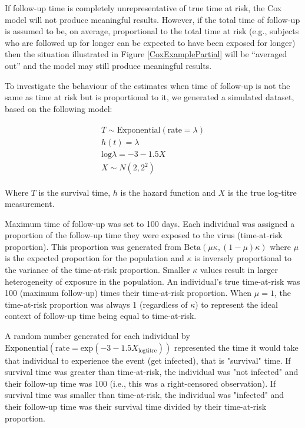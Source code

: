 If follow-up time is completely unrepresentative of true time at risk, the Cox model will not produce meaningful results. However, if the total time of follow-up is assumed to be, on average, proportional to the total time at risk (e.g., subjects who are followed up for longer can be expected to have been exposed for longer) then the situation illustrated in Figure  \ref{CoxExamplePartial} will be ``averaged out'' and the model may still produce meaningful results.

To investigate the behaviour of the estimates when time of follow-up is not the same as time at risk but is proportional to it, we generated a simulated dataset, based on the following model:

\begin{align*}
\begin{gathered}
T \sim \text{Exponential}(\text{rate} = \lambda) \\
h(t) = \lambda \\
\text{log}\lambda = -3 - 1.5 X \\
X \sim N(2, 2^2)
\end{gathered}
\end{align*}

Where $T$ is the survival time, $h$ is the hazard function and $X$ is the true log-titre measurement.

Maximum time of follow-up was set to 100 days. Each individual was assigned a proportion of the follow-up time they were exposed to the virus (time-at-risk proportion). This proportion was generated from $\text{Beta}(\mu \kappa, (1 - \mu) \kappa)$ where $\mu$ is the expected proportion for the population and $\kappa$ is inversely proportional to the variance of the time-at-risk proportion. Smaller $\kappa$ values result in larger heterogeneity of exposure in the population. An individual's true time-at-risk was 100 (maximum follow-up) times their time-at-risk proportion. When $\mu = 1$, the time-at-risk proportion was always 1 (regardless of $\kappa$) to represent the ideal context of follow-up time being equal to time-at-risk. 

A random number generated for each individual by $\text{Exponential}(\text{rate} = \text{exp}(-3 - 1.5 X_{\text{logtitre}}) )$ represented the time it would take that individual to experience the event (get infected), that is "survival" time. If survival time was greater than time-at-risk, the individual was "not infected" and their follow-up time was 100 (i.e., this was a right-censored observation). If survival time was smaller than time-at-risk, the individual was "infected" and their follow-up time was their survival time divided by their time-at-risk proportion. 

